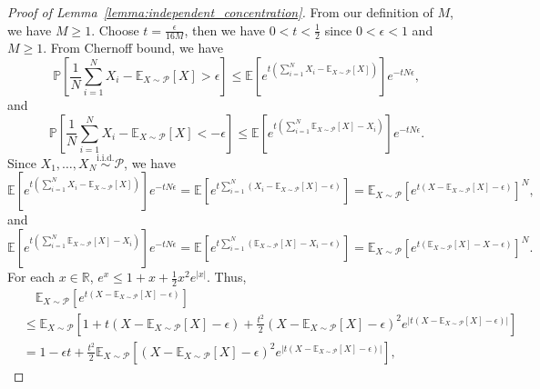 \begin{proof}[Proof of Lemma~\ref{lemma:independent_concentration}]
From our definition of $M$, we have $M \geq 1$. Choose $t = \frac{\epsilon}{16M}$, then we have $0 < t <\frac{1}{2}$ since $0 < \epsilon < 1$ and $M \geq 1$. From Chernoff bound, we have
\begin{equation*}
\mathbb{P}\left[ \frac{1}{N}\sum_{i=1}^N X_i - \mathbb{E}_{X \sim \mathcal{P}}[X] > \epsilon \right] \leq \mathbb{E}\left[e^{t\left(\sum_{i=1}^N X_i - \mathbb{E}_{X\sim \mathcal{P}}[X] \right)}\right]e^{-t N \epsilon} ,
\end{equation*}
and
\begin{equation*}
\mathbb{P}\left[ \frac{1}{N}\sum_{i=1}^N X_i - \mathbb{E}_{X \sim \mathcal{P}}[X] < -\epsilon \right] \leq \mathbb{E}\left[e^{t\left(\sum_{i=1}^N \mathbb{E}_{X\sim \mathcal{P}}[X] - X_i  \right)}\right]e^{-t N \epsilon}.
\end{equation*}
Since $X_1, \dots, X_N \overset{\mathrm{i.i.d.}}{\sim} \mathcal{P}$, we have
\begin{equation*}
\mathbb{E}\left[e^{t\left(\sum_{i=1}^N X_i - \mathbb{E}_{X\sim \mathcal{P}}[X] \right)}\right]e^{-t N \epsilon} = \mathbb{E}\left[e^{t\sum_{i=1}^N\left( X_i - \mathbb{E}_{X\sim \mathcal{P}}[X] -\epsilon \right)}\right] = \mathbb{E}_{X \sim \mathcal{P}}\left[e^{t\left( X - \mathbb{E}_{X\sim \mathcal{P}}[X] -\epsilon \right)}\right]^N,
\end{equation*}
and
\begin{equation*}
\mathbb{E}\left[e^{t\left(\sum_{i=1}^N \mathbb{E}_{X\sim \mathcal{P}}[X] - X_i  \right)}\right]e^{-t N \epsilon} = \mathbb{E}\left[e^{t\sum_{i=1}^N\left(\mathbb{E}_{X\sim \mathcal{P}}[X] - X_i -\epsilon \right)}\right] = \mathbb{E}_{X \sim \mathcal{P}}\left[e^{t\left( \mathbb{E}_{X\sim \mathcal{P}}[X]-X -\epsilon \right)}\right]^N.
\end{equation*}
For each $x \in \mathbb{R}$, $e^x \leq 1+x + \frac{1}{2}x^2 e^{|x|}$. Thus,
\begin{align*}
 &\quad \mathbb{E}_{X \sim \mathcal{P}}\left[e^{t\left( X - \mathbb{E}_{X\sim \mathcal{P}}[X] -\epsilon \right)}\right]\\
 &\leq \mathbb{E}_{X \sim \mathcal{P}} \left[ 1 + t\left(X - \mathbb{E}_{X \sim \mathcal{P}}[X]-\epsilon \right) + \frac{t^2}{2} \left(X - \mathbb{E}_{X \sim \mathcal{P}}[X]-\epsilon \right)^2 e^{\left|t\left(X - \mathbb{E}_{X \sim \mathcal{P}}[X]-\epsilon \right) \right|} \right]\\
 &=1 - \epsilon t + \frac{t^2}{2} \mathbb{E}_{X \sim \mathcal{P}} \left [\left(X - \mathbb{E}_{X \sim \mathcal{P}}[X]-\epsilon \right)^2 e^{\left|t \left(X - \mathbb{E}_{X \sim \mathcal{P}}[X]-\epsilon \right) \right|}  \right],

\end{align*}
\end{proof}
